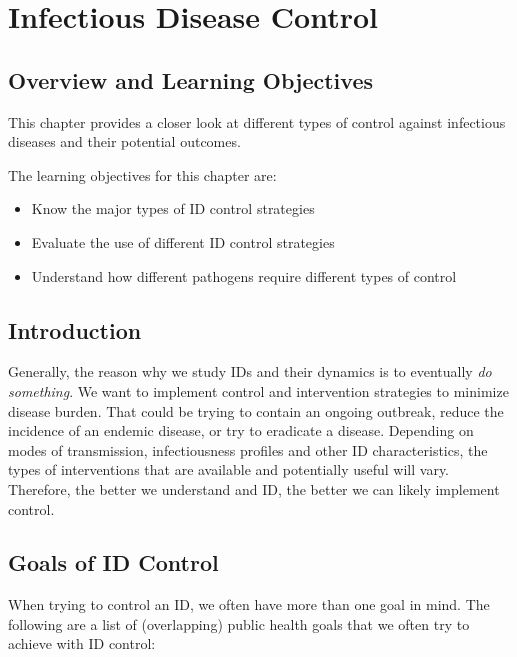 \documentclass[
]{book}
\providecommand{\tightlist}{%
  \setlength{\itemsep}{0pt}\setlength{\parskip}{0pt}}
\begin{document}
\hypertarget{infectious-disease-control}{%
\chapter{Infectious Disease Control}\label{infectious-disease-control}}

\hypertarget{overview-and-learning-objectives-8}{%
\section{Overview and Learning Objectives}\label{overview-and-learning-objectives-8}}

This chapter provides a closer look at different types of control against infectious diseases and their potential outcomes.

The learning objectives for this chapter are:

\begin{itemize}
\tightlist
\item
  Know the major types of ID control strategies
\item
  Evaluate the use of different ID control strategies
\item
  Understand how different pathogens require different types of control
\end{itemize}

\hypertarget{introduction-8}{%
\section{Introduction}\label{introduction-8}}

Generally, the reason why we study IDs and their dynamics is to eventually \emph{do something}. We want to implement control and intervention strategies to minimize disease burden. That could be trying to contain an ongoing outbreak, reduce the incidence of an endemic disease, or try to eradicate a disease. Depending on modes of transmission, infectiousness profiles and other ID characteristics, the types of interventions that are available and potentially useful will vary. Therefore, the better we understand and ID, the better we can likely implement control.

\hypertarget{goals-of-id-control}{%
\section{Goals of ID Control}\label{goals-of-id-control}}

When trying to control an ID, we often have more than one goal in mind. The following are a list of (overlapping) public health goals that we often try to achieve with ID control:
\end{document}
